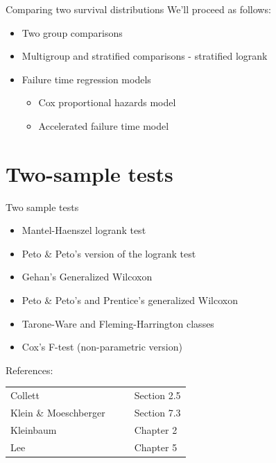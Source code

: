 \documentclass[envcountsect, 10pt, portrait, palatino]{beamer}
\begin{document}
\begin{frame}{Comparing two survival distributions}
We'll proceed as follows:
\begin{itemize}
\item  Two group comparisons
\item  Multigroup and stratified comparisons - stratified logrank
\item  Failure time regression models
\begin{itemize}
\item Cox proportional hazards model
\item Accelerated failure time model
\end{itemize}
\end{itemize}
\end{frame}
\section{Two-sample tests}
\begin{frame}{Two sample tests}

\begin{itemize}
\item Mantel-Haenszel logrank test
\item Peto \& Peto's version of the logrank test
\item Gehan's Generalized Wilcoxon
\item Peto \& Peto's and Prentice's generalized Wilcoxon
\item Tarone-Ware and Fleming-Harrington classes
\item Cox's F-test (non-parametric version)
\end{itemize}

\end{frame} \begin{frame}{References:}
\begin{tabular}{ll}
Collett & Section 2.5\\
Klein \& Moeschberger~~~~ & Section 7.3\\
Kleinbaum &  Chapter 2\\
Lee & Chapter 5\\
\end{tabular}
\end{frame}
\end{document}
